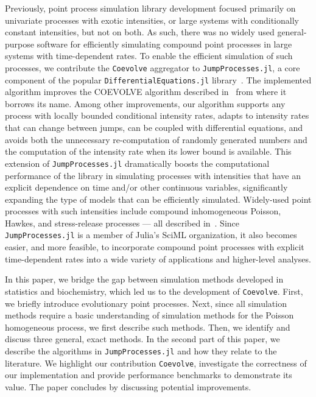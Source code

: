 \documentclass{juliacon}
\numberwithin{equation}{section}
\begin{document}
Previously, point process simulation library development focused primarily on univariate processes with exotic intensities, or large systems with conditionally constant intensities, but not on both. As such, there was no widely used general-purpose software for efficiently simulating compound point processes in large systems with time-dependent rates. To enable the efficient simulation of such processes, we contribute the \texttt{Coevolve} aggregator to \texttt{JumpProcesses.jl}, a core component of the popular \texttt{DifferentialEquations.jl} library~\cite{rackauckas2017}. The implemented algorithm improves the COEVOLVE algorithm described in~\cite{farajtabar2017} from where it borrows its name. Among other improvements, our algorithm supports any process with locally bounded conditional intensity rates, adapts to intensity rates that can change between jumps, can be coupled with differential equations, and avoids both the unnecessary re-computation of randomly generated numbers and the computation of the intensity rate when its lower bound is available. This extension of \texttt{JumpProcesses.jl} dramatically boosts the computational performance of the library in simulating processes with intensities that have an explicit dependence on time and/or other continuous variables,  significantly expanding the type of models that can be efficiently simulated. Widely-used point processes with such intensities include compound inhomogeneous Poisson, Hawkes, and stress-release processes --- all described in~\cite{daley2003}. Since \texttt{JumpProcesses.jl} is a member of Julia's SciML organization, it also becomes easier, and more feasible, to incorporate compound point processes with explicit time-dependent rates into a wide variety of applications and higher-level analyses.

In this paper, we bridge the gap between simulation methods developed in statistics and biochemistry, which led us to the development of \texttt{Coevolve}. First, we briefly introduce evolutionary point processes. Next, since all simulation methods require a basic understanding of simulation methods for the Poisson homogeneous process, we first describe such methods. Then, we identify and discuss three general, exact methods. In the second part of this paper, we describe the algorithms in \texttt{JumpProcesses.jl} and how they relate to the literature. We highlight our contribution \texttt{Coevolve}, investigate the correctness of our implementation and provide performance benchmarks to demonstrate its value. The paper concludes by discussing potential improvements.
\end{document}
